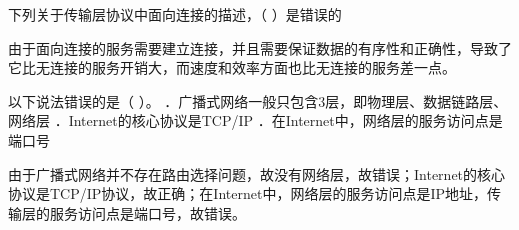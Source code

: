 \question 下列关于传输层协议中面向连接的描述，（ ）是错误的
\par{}
\begin{solution}由于面向连接的服务需要建立连接，并且需要保证数据的有序性和正确性，导致了它比无连接的服务开销大，而速度和效率方面也比无连接的服务差一点。
\end{solution}
\question 以下说法错误的是（ ）。
．广播式网络一般只包含3层，即物理层、数据链路层、网络层
．Internet的核心协议是TCP/IP
．在Internet中，网络层的服务访问点是端口号
\par{}
\begin{solution}由于广播式网络并不存在路由选择问题，故没有网络层，故错误；Internet的核心协议是TCP/IP协议，故正确；在Internet中，网络层的服务访问点是IP地址，传输层的服务访问点是端口号，故错误。
\end{solution}

